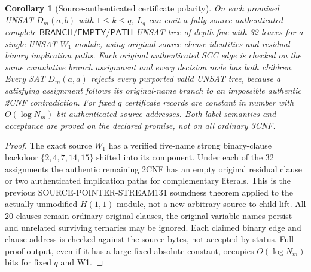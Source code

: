 \documentclass[11pt]{article}
\newtheorem{corollary}[theorem]{Corollary}
\begin{document}
\begin{corollary}[Source-authenticated certificate polarity]
On each promised UNSAT $D_m(a,b)$ with $1\le k\le q$, $L_q$ can emit a fully source-authenticated complete $\mathsf{BRANCH}/\mathsf{EMPTY}/\mathsf{PATH}$ UNSAT tree of depth five with 32 leaves for a single UNSAT $W_1$ module, using original source clause identities and residual binary implication paths. Each original authenticated SCC edge is checked on the same cumulative branch assignment and every decision node has both children. Every SAT $D_m(a,a)$ rejects every purported valid UNSAT tree, because a satisfying assignment follows its original-name branch to an impossible authentic 2CNF contradiction. For fixed $q$ certificate records are constant in number with $O(\log N_m)$-bit authenticated source addresses. Both-label semantics and acceptance are proved on the \emph{declared promise}, not on all ordinary 3CNF.
\end{corollary}
\begin{proof}
The exact source $W_1$ has a verified five-name strong binary-clause backdoor $\{2,4,7,14,15\}$ shifted into its component. Under each of the 32 assignments the authentic remaining 2CNF has an empty original residual clause or two authenticated implication paths for complementary literals. This is the previous SOURCE-POINTER-STREAM131 soundness theorem applied to the actually unmodified $H(1,1)$ module, not a new arbitrary source-to-child lift. All 20 clauses remain ordinary original clauses, the original variable names persist and unrelated surviving ternaries may be ignored. Each claimed binary edge and clause address is checked against the source bytes, not accepted by status. Full proof output, even if it has a large fixed absolute constant, occupies $O(\log N_m)$ bits for fixed $q$ and W1.\end{proof}
\end{document}
